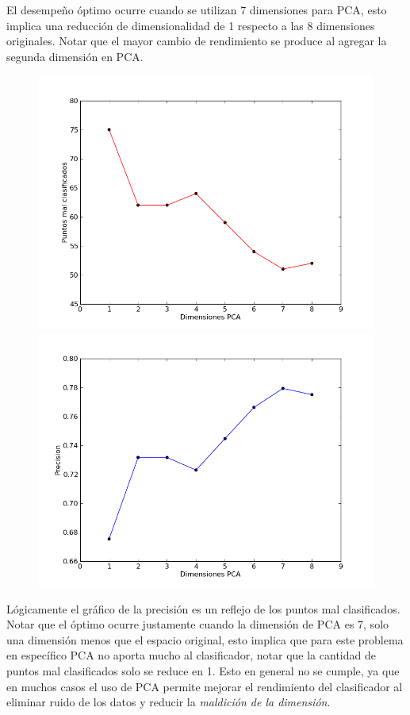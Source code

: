 \documentclass[letter, titlepage, 10pt]{article}
\begin{document}
El desempeño óptimo ocurre cuando se utilizan 7 dimensiones para PCA, esto implica una reducción de dimensionalidad de 1 respecto a las 8 dimensiones originales. Notar que el mayor cambio de rendimiento se produce al agregar la segunda dimensión en PCA. 

\begin{figure}[H]
  \centering
    \begin{minipage}{.5\textwidth}
        \centering
        \includegraphics[width=0.8\linewidth]{images/error_pca}
    \end{minipage}%
    \begin{minipage}{.5\textwidth}
        \centering
        \includegraphics[width=0.8\linewidth]{images/precision_pca}
    \end{minipage}
\end{figure}

Lógicamente el gráfico de la precisión es un reflejo de los puntos mal clasificados. Notar que el óptimo ocurre justamente cuando la dimensión de PCA es 7, solo una dimensión menos que el espacio original, esto implica que para este problema en específico PCA no aporta mucho al clasificador, notar que la cantidad de puntos mal clasificados solo se reduce en 1. Esto en general no se cumple, ya que en muchos casos el uso de PCA permite mejorar el rendimiento del clasificador al eliminar ruido de los datos y reducir la \textit{maldición de la dimensión}.
\end{document}
